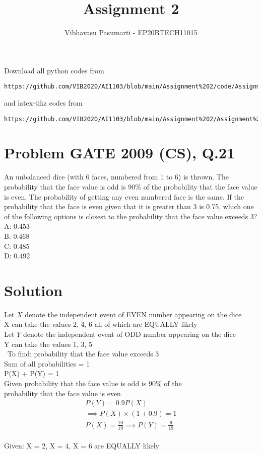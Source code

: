 \documentclass[journal,12pt,twocolumn]{IEEEtran}
\begin{document}
\title{Assignment 2}
\author{Vibhavasu Pasumarti - EP20BTECH11015}
\maketitle
\newpage
\bigskip
\renewcommand{\thefigure}{\theenumi}
\renewcommand{\thetable}{\theenumi}
Download all python codes from 
\begin{lstlisting}
https://github.com/VIB2020/AI1103/blob/main/Assignment%202/code/Assignment%202.py
\end{lstlisting}
%
and latex-tikz codes from 
%
\begin{lstlisting}
https://github.com/VIB2020/AI1103/blob/main/Assignment%202/Assignment%202.tex
\end{lstlisting}
\section{\Large Problem \large GATE 2009 (CS), Q.21}
An unbalanced dice (with 6 faces, numbered from 1 to 6) is thrown. The probability that the face value is odd is 90\% of the probability that the face value is even. The probability of getting any even numbered face is the same. If the probability that the face is even given that it is greater than 3 is 0.75, which one of the following options is closest to the probability that the face value exceeds 3?\\[7pt]
 A: 0.453\\
 B: 0.468\\
 C: 0.485\\
 D: 0.492\\
\section{\Large Solution}
Let $X$ denote the independent event of EVEN number appearing on 
the dice\\
X can take the values 2, 4, 6 all of which are EQUALLY likely\\
Let $Y$ denote the independent event of ODD number appearing on 
the dice\\
Y can take the values 1, 3, 5\\\
To find: probability that the face value exceeds 3\\[5pt]
Sum of all probabilities = 1\\[5pt]
P(X) + P(Y) = 1\\[5pt]
Given probability that the face value is odd is 90\% of the\\ probability that the face value is even
\begin{align}
P(Y) = 0.9P(X)\\
\implies P(X)\times (1 + 0.9) = 1\\
P(X) = \frac{10}{19} \implies P(Y) = \frac{9}{19}
\end{align}\\[5pt]
Given: X = 2, X = 4, X = 6 are EQUALLY likely\\[5pt]
\end{document}
